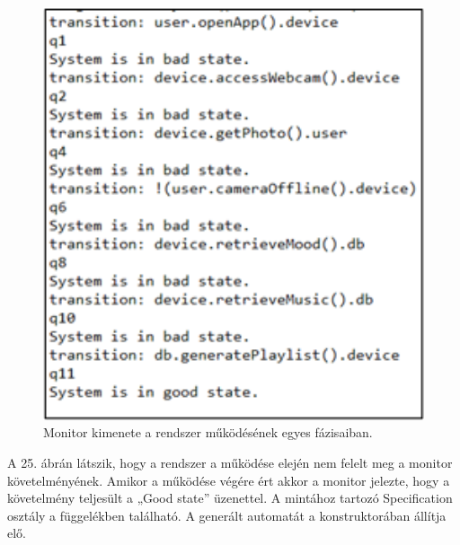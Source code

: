 \begin{figure}[!ht]
    \centering
    \includegraphics[width=150mm, keepaspectratio]{figures/23abra.png}
    \caption{Monitor kimenete a rendszer működésének egyes fázisaiban.}
\end{figure}
A 25. ábrán látszik, hogy a rendszer a működése elején nem felelt meg a monitor követelményének. Amikor a működése végére ért akkor a monitor jelezte, hogy a követelmény teljesült a „Good state” üzenettel. A mintához tartozó Specification osztály a függelékben található. A generált automatát a konstruktorában állítja elő.